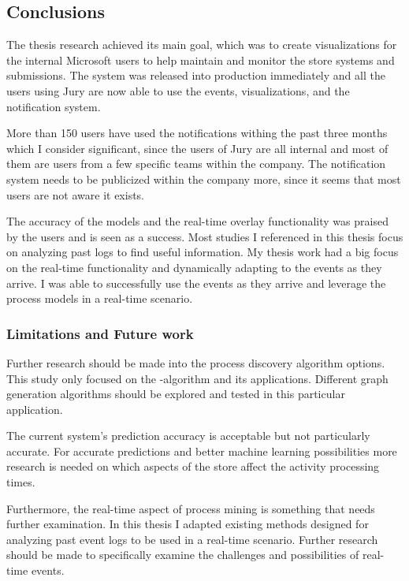 
\subsection{Conclusions} 
\label{sec:conclusions}

The thesis research achieved its main goal, which was to create visualizations for the internal Microsoft users to help maintain and monitor the store systems and submissions.
The system was released into production immediately and all the users using Jury are now able to use the events, visualizations, and the notification system.

More than 150 users have used the notifications withing the past three months which I consider significant, since the users of Jury are all internal and most of them are users from a few specific teams within the company.
The notification system needs to be publicized within the company more, since it seems that most users are not aware it exists.

The accuracy of the models and the real-time overlay functionality was praised by the users and is seen as a success.
Most studies I referenced in this thesis focus on analyzing past logs to find useful information.
My thesis work had a big focus on the real-time functionality and dynamically adapting to the events as they arrive.
I was able to successfully use the events as they arrive and leverage the process models in a real-time scenario.

\subsubsection{Limitations and Future work} 

Further research should be made into the process discovery algorithm options.
This study only focused on the \textalpha-algorithm and its applications. 
Different graph generation algorithms should be explored and tested in this particular application.

The current system's prediction accuracy is acceptable but not particularly accurate.
For accurate predictions and better machine learning possibilities more research is needed on which aspects of the store affect the activity processing times.

Furthermore, the real-time aspect of process mining is something that needs further examination. In this thesis I adapted existing methods designed for analyzing past event logs to be used in a real-time scenario.
Further research should be made to specifically examine the challenges and possibilities of real-time events.

